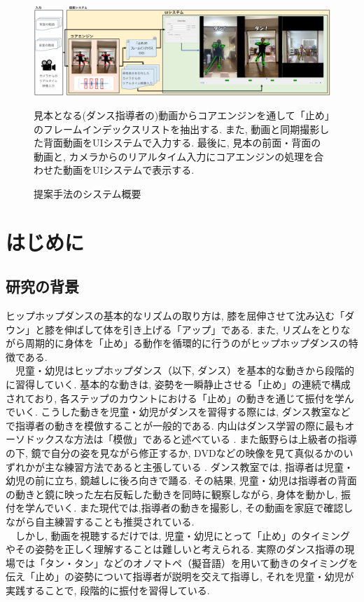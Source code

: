 \documentclass[paper]{ieicej}
\begin{document}
\begin{figure}[t]  %
  \centering
  \includegraphics[width=\textwidth]{./images/summary.png}
  \caption{提案手法のシステム概要}
  \label{fig:summary}
  \begin{flushleft}
    \footnotesize 見本となる(ダンス指導者の)動画からコアエンジンを通して「止め」のフレームインデックスリストを抽出する. また, 動画と同期撮影した背面動画をUIシステムで入力する. 最後に, 見本の前面・背面の動画と, カメラからのリアルタイム入力にコアエンジンの処理を合わせた動画をUIシステムで表示する.
  \end{flushleft}
  \vspace{-3em}  %
\end{figure}

\section{はじめに}
\subsection{研究の背景}
ヒップホップダンスの基本的なリズムの取り方は, 膝を屈伸させて沈み込む「ダウン」と膝を伸ばして体を引き上げる「アップ」である\cite{ref7}. また, リズムをとりながら周期的に身体を「止め」る動作を循環的に行うのがヒップホップダンスの特徴である. \\
　児童・幼児はヒップホップダンス（以下, ダンス）を基本的な動きから段階的に習得していく. 基本的な動きは, 姿勢を一瞬静止させる「止め」の連続で構成されており, 各ステップのカウントにおける「止め」の動きを通じて振付を学んでいく. \cite{ref7} こうした動きを児童・幼児がダンスを習得する際には, ダンス教室などで指導者の動きを模倣することが一般的である. 内山はダンス学習の際に最もオーソドックスな方法は「模倣」であると述べている \cite{ref8}. また飯野らは上級者の指導の下, 鏡で自分の姿を見ながら修正するか, DVDなどの映像を見て真似るかのいずれかが主な練習方法であると主張している \cite{ref9}. ダンス教室では, 指導者は児童・幼児の前に立ち, 鏡越しに後ろ向きで踊る. その結果, 児童・幼児は指導者の背面の動きと鏡に映った左右反転した動きを同時に観察しながら, 身体を動かし, 振付を学んでいく. また現代では,指導者の動きを撮影し, その動画を家庭で確認しながら自主練習することも推奨されている. \\
　しかし, 動画を視聴するだけでは, 児童・幼児にとって「止め」のタイミングやその姿勢を正しく理解することは難しいと考えられる. 実際のダンス指導の現場では「タン・タン」などのオノマトペ（擬音語）を用いて動きのタイミングを伝え「止め」の姿勢について指導者が説明を交えて指導し, それを児童・幼児が実践することで, 段階的に振付を習得している. 
\end{document}
